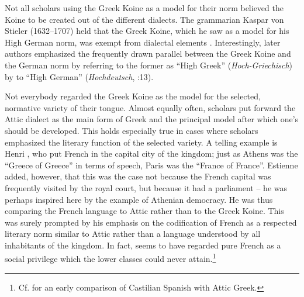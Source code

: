 Not all scholars using the Greek Koine as a model for their  norm believed the Koine to be created out of the different dialects. The grammarian Kaspar von Stieler (1632–1707) held that the Greek Koine, which he saw as a model for his High German norm, was exempt from dialectal elements \citep[2]{Stieler1691}. Interestingly, later authors emphasized the frequently drawn parallel between the Greek Koine and the German norm by referring to the former as “High Greek” (\textit{Hoch-Griechisch}) by  to “High German” (\textit{Hochdeutsch}, \citealt{Schuster1737}:13).

Not everybody regarded the Greek Koine as the model for the selected, normative variety of their  tongue. Almost equally often, scholars put forward the Attic dialect as the main form of Greek and the principal model after which one’s  should be developed. This holds especially true in cases where scholars emphasized the literary function of the selected variety. A telling example is Henri \citet[*.iii\textsc{\textsuperscript{v}}]{Estienne1582}, who put French in the capital city of the kingdom; just as Athens was the “Greece of Greece” in terms of speech, Paris was the “France of France”. Estienne added, however, that this was the case not because the French capital was frequently visited by the royal court, but because it had a parliament – he was perhaps inspired here by the example of Athenian democracy. He was thus comparing the French language to Attic rather than to the Greek Koine. This was surely prompted by his emphasis on the codification of French as a respected literary norm similar to Attic rather than a language understood by all inhabitants of the kingdom. In fact, \citet[*.iii\textsc{\textsuperscript{r}}]{Estienne1582} seems to have regarded pure French as a social privilege which the lower classes could never attain.\footnote{Cf. \citet[\textsc{xxxiii}\textsc{\textsuperscript{v}}]{Marineo1497} for an early comparison of Castilian Spanish with Attic Greek.}

